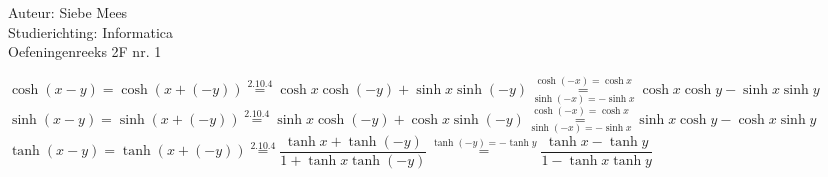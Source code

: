 \documentclass[a4paper]{article}
\begin{document}
  
\noindent \large Auteur: Siebe Mees \\
\noindent \large Studierichting: Informatica \\
\noindent \large Oefeningenreeks 2F nr. 1 \\

\medskip

\normalsize

$ \cosh(x - y) = \cosh(x + (-y)) \overset{2.10.4}{=} \cosh x \cosh(-y) + \sinh x \sinh(-y) \overset{\cosh (-x) = \cosh x}{\underset{\sinh(-x) = -\sinh x}{=}} \cosh x \cosh y - \sinh x \sinh y $ \\

$ \sinh(x - y) = \sinh(x + (-y)) \overset{2.10.4}{=} \sinh x \cosh(-y) + \cosh x \sinh(-y) \overset{\cosh (-x) = \cosh x}{\underset{\sinh(-x) = -\sinh x}{=}} \sinh x \cosh y - \cosh x \sinh y $ \\

$ \tanh(x - y) = \tanh(x + (-y)) \overset{2.10.4}{=} \dfrac{\tanh x + \tanh(-y)}{1 + \tanh x \tanh(-y)} \overset{\tanh (-y) = - \tanh y}{=} \dfrac{\tanh x - \tanh y}{1 - \tanh x \tanh y} $ \\

\begin{thebibliography}{999}
\end{thebibliography}
\end{document}
